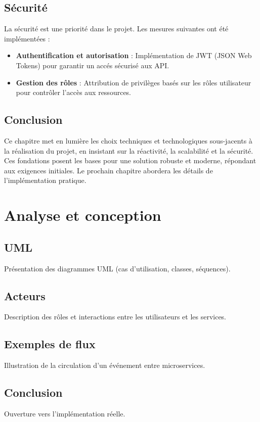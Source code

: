 \documentclass[12pt,a4paper]{report}
\begin{document}
\section{S\'ecurit\'e}
La s\'ecurit\'e est une priorit\'e dans le projet. Les mesures suivantes ont \'et\'e impl\'ement\'ees :
\begin{itemize}
    \item \textbf{Authentification et autorisation} : Impl\'ementation de JWT (JSON Web Tokens) pour garantir un acc\'es s\'ecuris\'e aux API.
    \item \textbf{Gestion des r\^oles} : Attribution de privil\`eges bas\'es sur les r\^oles utilisateur pour contr\^oler l'acc\`es aux ressources.
\end{itemize}

\section*{Conclusion}
Ce chapitre met en lumi\`ere les choix techniques et technologiques sous-jacents \`a la r\'ealisation du projet, en insistant sur la r\'eactivit\'e, la scalabilit\'e et la s\'ecurit\'e. Ces fondations posent les bases pour une solution robuste et moderne, r\'epondant aux exigences initiales. Le prochain chapitre abordera les d\'etails de l'impl\'ementation pratique.


\chapter{Analyse et conception}

\section{UML}
Présentation des diagrammes UML (cas d’utilisation, classes, séquences).

\section{Acteurs}
Description des rôles et interactions entre les utilisateurs et les services.

\section{Exemples de flux}
Illustration de la circulation d’un événement entre microservices.

\section*{Conclusion}
Ouverture vers l’implémentation réelle.
\end{document}
